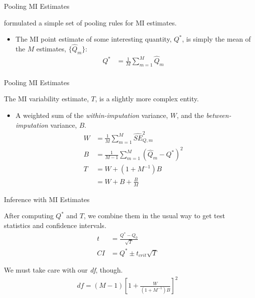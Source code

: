 \documentclass{beamer}\usepackage[]{graphicx}\usepackage[]{color}
\begin{document}

\begin{frame}{Pooling MI Estimates}
  
  \citet{rubin:1987} formulated a simple set of pooling rules for MI estimates.
  \vb
  \begin{itemize}
  \item The MI point estimate of some interesting quantity, $Q^*$, is simply 
    the mean of the $M$ estimates, $\{\hat{Q}_m\}$:
    \begin{align*}
      Q^* &= \frac{1}{M} \sum_{m = 1}^M \hat{Q}_m\\
    \end{align*}
  \end{itemize}
  
\end{frame}


\begin{frame}{Pooling MI Estimates}
  
  The MI variability estimate, $T$, is a slightly more complex entity.
  \vb
  \begin{itemize}
  \item A weighted sum of the \emph{within-imputation} variance, $W$, and the 
    \emph{between-imputation} variance, $B$.
    \begin{align*}
      W &= \frac{1}{M} \sum_{m = 1}^M \widehat{SE}_{Q,m}^2\\
      B &= \frac{1}{M - 1} \sum_{m = 1}^M \left( \hat{Q}_m - Q^* \right)^2\\
      T &= W + \left( 1 + M^{-1} \right) B\\ 
      &= W + B + \frac{B}{M}
    \end{align*}
  \end{itemize}
  
\end{frame}


\begin{frame}{Inference with MI Estimates}
  
  After computing $Q^*$ and $T$, we combine them in the usual way to get test 
  statistics and confidence intervals.
  \begin{align*}
    t &= \frac{Q^* - Q_0}{\sqrt{T}}\\
    CI &= Q^* \pm t_{crit} \sqrt{T}
  \end{align*}
  
  We must take care with our \emph{df}, though.
  \begin{align*}
    df = (M - 1) \left[1 + \frac{W}{\left(1 + M^{-1}\right)B}\right]^2
  \end{align*}
  
\end{frame}
\end{document}

